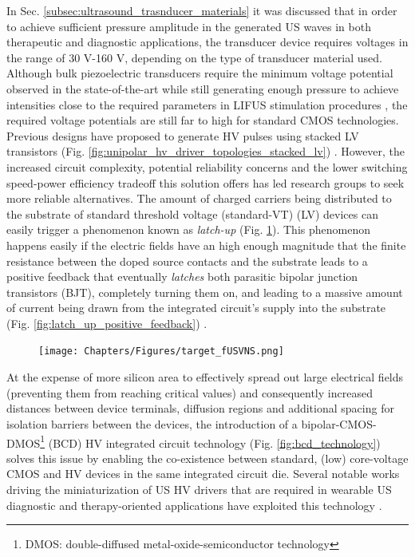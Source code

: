 In Sec. \ref{subsec:ultrasound_trasnducer_materials} it was discussed that in order to achieve sufficient pressure amplitude in the generated US waves in both therapeutic and diagnostic applications, the transducer device requires voltages in the range of 30 V-160 V, depending on the type of transducer material used. Although bulk piezoelectric transducers require the minimum voltage potential observed in the state-of-the-art while still generating enough pressure to achieve intensities close to the required parameters in LIFUS stimulation procedures \cite{TiagoCosta2018}, the required voltage potentials are still far to high for standard CMOS technologies. Previous designs have proposed to generate HV pulses using stacked LV transistors (Fig. \ref{fig:unipolar_hv_driver_topologies_stacked_lv}) \cite{https://ieeexplore.ieee.org/document/6823174}\cite{https://ieeexplore.ieee.org/document/9340356}. However, the increased circuit complexity, potential reliability concerns and the lower switching speed-power efficiency tradeoff this solution offers has led research groups to seek more reliable alternatives.
The amount of charged carriers being distributed to the substrate of standard threshold voltage (standard-VT) (LV) devices can easily trigger a phenomenon known as \textit{latch-up} (Fig. \ref{fig:latch_up}). This phenomenon happens easily if the electric fields have an high enough magnitude that the finite resistance between the doped source contacts and the substrate leads to a positive feedback that eventually \textit{latches} both parasitic bipolar junction transistors (BJT), completely turning them on, and leading to a massive amount of current being drawn from the integrated circuit's supply into the substrate (Fig. \ref{fig:latch_up_positive_feedback}) \cite{RahzaviDesignofAnalogCMOSCircuits2ndEd}.

\begin{figure}[ht]
  \centering
  \texttt{[image: Chapters/Figures/target\_fUSVNS.png]}
  \label{fig:latch_up}
\end{figure}

At the expense of more silicon area to effectively spread out large electrical fields (preventing them from reaching critical values) and consequently increased distances between device terminals, diffusion regions and additional spacing for isolation barriers between the devices, the introduction of a bipolar-CMOS-DMOS\footnote{DMOS: double-diffused metal-oxide-semiconductor technology} (BCD) HV integrated circuit technology (Fig. \ref{fig:bcd_technology}) solves this issue by enabling the co-existence between standard, (low) core-voltage CMOS and HV devices in the same integrated circuit die. Several notable works driving the miniaturization of US HV drivers that are required in wearable US diagnostic and therapy-oriented applications have exploited this technology \cite{works_on_stimulation_US_devices}.

